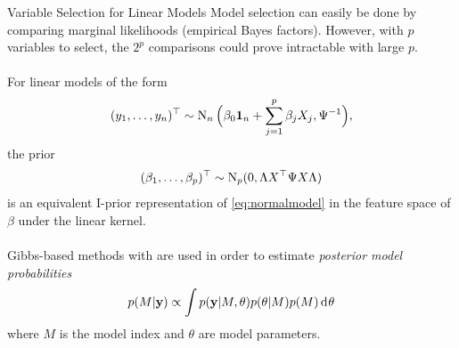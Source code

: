 \documentclass{beamer}
\newlength{\onecolwid}
\begin{document}
\begin{frame}[t]
\begin{columns}[t]
\begin{column}{\onecolwid}
\vspace{1mm}
\begin{block}{Variable Selection for Linear Models}
Model selection can easily be done by comparing marginal likelihoods (empirical Bayes factors). However, with $p$ variables to select, the $2^p$ comparisons could prove intractable with large $p$.
\\~\\[-0.8ex]
For linear models of the form
\[
  (y_1,\dots,y_n)^\top \sim \operatorname{N}_n \Big( \beta_0{\mathbf 1}_n + \sum_{j=1}^p \beta_j X_j, \Psi^{-1} \Big),
\]
\vspace{-8pt}
the prior
\vspace{-8pt}
\[
  (\beta_1,\dots,\beta_p)^\top \sim \operatorname{N}_p(0, \Lambda X^\top \Psi X \Lambda)
\]
is an equivalent I-prior representation of \eqref{eq:normalmodel} in the feature space of $\beta$ under the linear kernel. 
\\~\\[-0.8ex]
Gibbs-based methods with are used in order to estimate \emph{posterior model probabilities}
\[
  p(M | {\mathbf y}) \propto \int p({\mathbf y}|M, \theta) p(\theta|M) p(M) \operatorname{d\!\:\!}\theta
\]
where $M$ is the model index and $\theta$ are model parameters.
\\~\\[-0.8ex]


\end{block}
\end{column}
\end{columns}
\end{frame}
\end{document}
